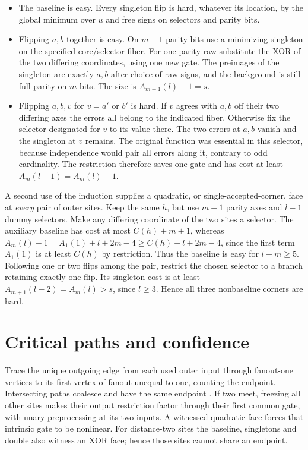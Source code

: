 \documentclass[11pt]{article}
\begin{document}
\begin{itemize}
\item The baseline is easy. Every singleton flip is hard, whatever its location, by the global minimum over \(u\) and free signs on selectors and parity bits.
\item Flipping \(a,b\) together is easy. On \(m-1\) parity bits use a minimizing singleton on the specified core/selector fiber. For one parity raw substitute the XOR of the two differing coordinates, using one new gate. The preimages of the singleton are exactly \(a,b\) after choice of raw signs, and the background is still full parity on \(m\) bits. The size is \(A_{m-1}(l)+1=s\).
\item Flipping \(a,b,v\) for \(v=a'\) or \(b'\) is hard. If \(v\) agrees with \(a,b\) off their two differing axes the errors all belong to the indicated fiber. Otherwise fix the selector designated for \(v\) to its value there. The two errors at \(a,b\) vanish and the singleton at \(v\) remains. The original function was essential in this selector, because independence would pair all errors along it, contrary to odd cardinality. The restriction therefore saves one gate and has cost at least \(A_m(l-1)=A_m(l)-1\).
\end{itemize}

A second use of the induction supplies a quadratic, or single-accepted-corner, face at \emph{every} pair of outer sites. Keep the same \(h\), but use \(m+1\) parity axes and \(l-1\) dummy selectors. Make any differing coordinate of the two sites a selector. The auxiliary baseline has cost at most \(C(h)+m+1\), whereas \(A_m(l)-1=A_1(1)+l+2m-4\ge C(h)+l+2m-4\), since the first term \(A_1(1)\) is at least \(C(h)\) by restriction. Thus the baseline is easy for \(l+m\ge5\). Following one or two flips among the pair, restrict the chosen selector to a branch retaining exactly one flip. Its singleton cost is at least \(A_{m+1}(l-2)=A_m(l)>s\), since \(l\ge3\). Hence all three nonbaseline corners are hard. 

\section{Critical paths and confidence}

Trace the unique outgoing edge from each used outer input through fanout-one vertices to its first vertex of fanout unequal to one, counting the endpoint. Intersecting paths coalesce and have the same endpoint \cite[Section~4.4]{cly}. If two meet, freezing all other sites makes their output restriction factor through their first common gate, with unary preprocessing at its two inputs. A witnessed quadratic face forces that intrinsic gate to be nonlinear. For distance-two sites the baseline, singletons and double also witness an XOR face; hence those sites cannot share an endpoint.
\end{document}
